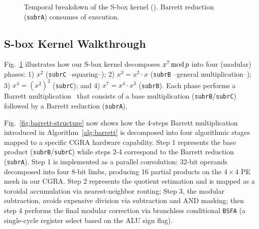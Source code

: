 \begin{figure}[t]
{%
}
\caption{Temporal breakdown of the S-box kernel (\cc{\MetricSboxKernelComputeCC}). Barrett reduction (\texttt{subrA}) consumes \pct{\MetricSboxKernelBarrettSharePct} of execution.}
\label{fig:sbox-pipeline}
\end{figure}


\subsection{S-box Kernel Walkthrough}
\label{subsec:sbox-openedge}

Fig.~\ref{fig:sbox-pipeline} illustrates how our S-box kernel decomposes $x^7 \operatorname{mod} p$ into four (modular) phases: 1) $x^2$ (\texttt{subrC} --squaring--); 2) $x^3 = x^2 \cdot x$ (\texttt{subrB} --general multiplication--); 3) $x^4 = (x^2)^2$ (\texttt{subrC}); and 4) $x^7 = x^4 \cdot x^3$ (\texttt{subrB}). Each phase performs a  Barrett multiplication~\cite{barrett1986} that consists of a base multiplication (\texttt{subrB}/\texttt{subrC}) followed by a Barrett reduction (\texttt{subrA}).




Fig.~\ref{fig:barrett-structure} now shows how the 4-steps Barrett multiplication introduced in Algorithm~\ref{alg:barrett} is decomposed into four algorithmic stages mapped to a specific CGRA hardware capability. Step 1 represents the base product (\texttt{subrB}/\texttt{subrC}) while steps 2-4 correspond to the Barrett reduction (\texttt{subrA}). Step 1 is implemented as a parallel convolution: 32-bit operands decomposed into four 8-bit limbs, producing 16 partial products on the $4\!\times\!4$ PE mesh in our CGRA. Step 2 represents the quotient estimation and is mapped as a toroidal accumulation via nearest-neighbor routing; Step 3, the modular subtraction, avoids expensive division via subtraction and AND masking; then step 4 performs the final modular correction via branchless conditional \texttt{BSFA} (a single-cycle register select based on the ALU sign flag).



